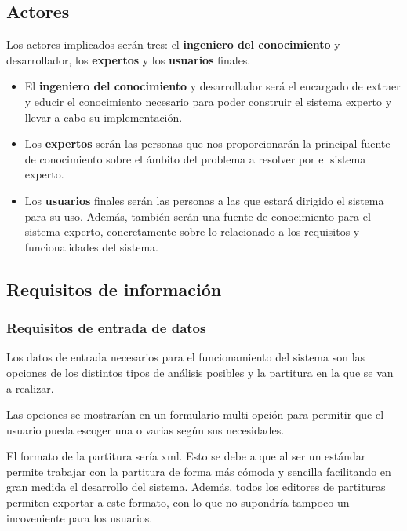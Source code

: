 \subsection{Actores}

Los actores implicados serán tres: el \textbf{ingeniero del conocimiento} y desarrollador, los \textbf{expertos} y los \textbf{usuarios} finales.

\begin{itemize}

	\item El \textbf{ingeniero del conocimiento} y desarrollador será el encargado de extraer y educir el conocimiento necesario para poder construir el sistema experto y llevar a cabo su implementación.

	\item Los \textbf{expertos} serán las personas que nos proporcionarán la principal fuente de conocimiento sobre el ámbito del problema a resolver por el sistema experto.	

	\item Los \textbf{usuarios} finales serán las personas a las que estará dirigido el sistema para su uso. Además, también serán una fuente de conocimiento para el sistema experto, concretamente sobre lo relacionado a los requisitos y funcionalidades del sistema.

\end{itemize}

\subsection{Requisitos de información}

\subsubsection{Requisitos de entrada de datos}

Los datos de entrada necesarios para el funcionamiento del sistema son las opciones de los distintos tipos de análisis posibles y la partitura en la que se van a realizar. 

Las opciones se mostrarían en un formulario multi-opción para permitir que el usuario pueda escoger una o varias según sus necesidades. 

El formato de la partitura sería xml. Esto se debe a que al ser un estándar permite trabajar con la partitura de forma más cómoda y sencilla facilitando en gran medida el desarrollo del sistema. Además, todos los editores de partituras permiten exportar a este formato, con lo que no supondría tampoco un incoveniente para los usuarios.

